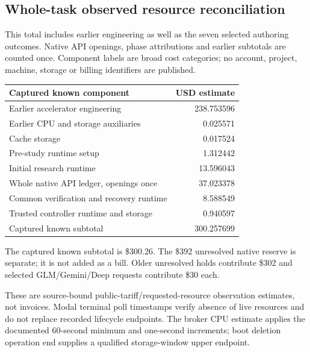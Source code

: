 \documentclass[11pt,letterpaper]{article}
\begin{document}
\subsection{Whole-task observed resource reconciliation}

This total includes earlier engineering as well as the seven selected authoring outcomes. Native API openings, phase attributions and earlier subtotals are counted once. Component labels are broad cost categories; no account, project, machine, storage or billing identifiers are published.

\small\begin{tabularx}{\linewidth}{@{}Xr@{}}\toprule\textbf{Captured known component} & \textbf{USD estimate}\\\midrule

Earlier accelerator engineering & 238.753596\\

Earlier CPU and storage auxiliaries & 0.025571\\

Cache storage & 0.017524\\

Pre-study runtime setup & 1.312442\\

Initial research runtime & 13.596043\\

Whole native API ledger, openings once & 37.023378\\

Common verification and recovery runtime & 8.588549\\

Trusted controller runtime and storage & 0.940597\\

\midrule Captured known subtotal & 300.257699\\

\bottomrule\end{tabularx}\normalsize

The captured known subtotal is \$300.26. The \$392 unresolved native reserve is separate; it is not added as a bill. Older unresolved holds contribute \$302 and selected GLM/Gemini/Deep requests contribute \$30 each.

These are source-bound public-tariff/requested-resource observation estimates, not invoices. Modal terminal poll timestamps verify absence of live resources and do not replace recorded lifecycle endpoints. The broker CPU estimate applies the documented 60-second minimum and one-second increments; boot deletion operation end supplies a qualified storage-window upper endpoint.
\end{document}
